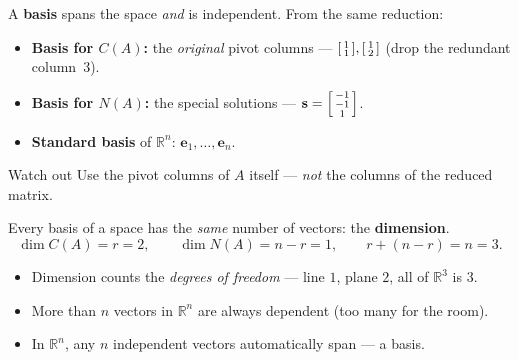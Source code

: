 \documentclass[aspectratio=169, 11pt]{beamer}
\newcommand{\svec}{\mathbf{s}}
\begin{document}
\begin{frame}[t, plain]
  A \textbf{basis} spans the space \emph{and} is independent. From the same reduction:
  \begin{itemize}
    \setlength{\itemsep}{5pt}
    \item \textbf{Basis for $C(A)$:} the \emph{original} pivot columns --- $\begin{bsmallmatrix} 1\\1 \end{bsmallmatrix},\begin{bsmallmatrix} 1\\2 \end{bsmallmatrix}$ (drop the redundant column~3).
    \item \textbf{Basis for $N(A)$:} the special solutions --- $\svec=\begin{bsmallmatrix} -1\\-1\\1 \end{bsmallmatrix}$.
    \item \textbf{Standard basis} of $\mathbb{R}^n$: $\mathbf{e}_1,\dots,\mathbf{e}_n$.
  \end{itemize}
  \vspace{2pt}
  \begin{block}{Watch out}
    Use the pivot columns of $A$ itself --- \emph{not} the columns of the reduced matrix.
  \end{block}
\end{frame}

\begin{frame}[t, plain]
  Every basis of a space has the \emph{same} number of vectors: the \textbf{dimension}.
  \[
    \dim C(A)=r=2, \qquad \dim N(A)=n-r=1, \qquad r+(n-r)=n=3.
  \]
  \begin{itemize}
    \setlength{\itemsep}{4pt}
    \item Dimension counts the \emph{degrees of freedom} --- line $1$, plane $2$, all of $\mathbb{R}^3$ is $3$.
    \item More than $n$ vectors in $\mathbb{R}^n$ are always dependent (too many for the room).
    \item In $\mathbb{R}^n$, any $n$ independent vectors automatically span --- a basis.
  \end{itemize}
\end{frame}
\end{document}
